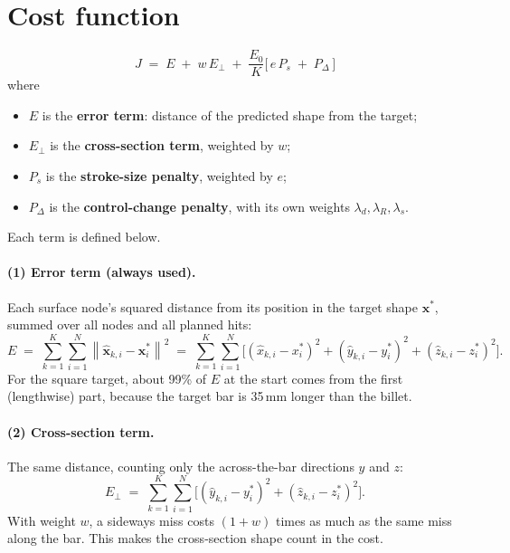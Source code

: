 \documentclass[11pt]{article}
\begin{document}
\section{Cost function}

\begin{equation}
  \boxed{\; J \;=\; E \;+\; w\, E_{\perp} \;+\; \frac{E_0}{K} \Big[\, e\, P_{s} \;+\; P_{\Delta} \,\Big] \;}
\end{equation}
where
\begin{itemize}
  \item[(1)] $E$ is the \textbf{error term}: distance of the predicted shape from the target;
  \item[(2)] $E_{\perp}$ is the \textbf{cross-section term}, weighted by $w$;
  \item[(3)] $P_{s}$ is the \textbf{stroke-size penalty}, weighted by $e$;
  \item[(4)] $P_{\Delta}$ is the \textbf{control-change penalty}, with its own weights $\lambda_d, \lambda_R, \lambda_s$.
\end{itemize}
Each term is defined below.

\paragraph{(1) Error term (always used).}
Each surface node's squared distance from its position in the target shape
$\mathbf{x}^{*}$, summed over all nodes and all planned hits:
\begin{equation}
  E \;=\; \sum_{k=1}^{K} \sum_{i=1}^{N} \left\lVert \hat{\mathbf{x}}_{k,i} - \mathbf{x}^{*}_{i} \right\rVert^{2}
  \;=\; \sum_{k=1}^{K} \sum_{i=1}^{N} \Big[ (\hat{x}_{k,i} - x^{*}_{i})^{2} + (\hat{y}_{k,i} - y^{*}_{i})^{2} + (\hat{z}_{k,i} - z^{*}_{i})^{2} \Big].
\end{equation}
For the square target, about 99\% of $E$ at the start comes from the first
(lengthwise) part, because the target bar is 35\,mm longer than the billet.

\paragraph{(2) Cross-section term.}
The same distance, counting only the across-the-bar directions $y$ and $z$:
\begin{equation}
  E_{\perp} \;=\; \sum_{k=1}^{K} \sum_{i=1}^{N} \Big[ (\hat{y}_{k,i} - y^{*}_{i})^{2} + (\hat{z}_{k,i} - z^{*}_{i})^{2} \Big].
\end{equation}
With weight $w$, a sideways miss costs $(1 + w)$ times as much as the same miss
along the bar. This makes the cross-section shape count in the cost.
\end{document}
